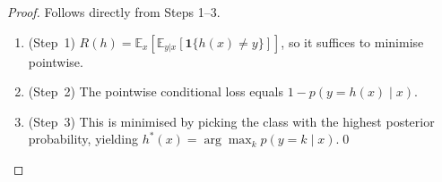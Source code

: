 \documentclass[11pt]{article}
\theoremstyle{definition}
\theoremstyle{remark}
\newcommand{\E}{\mathbb{E}}
\begin{document}
\begin{proof}
    Follows directly from Steps 1--3.
    \begin{enumerate}
        \item (Step~1) $R(h) = \E_{x}[\E_{y|x}[\mathbf{1}\{h(x)\neq y\}]]$,
              so it suffices to minimise pointwise.
        \item (Step~2) The pointwise conditional loss equals $1 - p(y = h(x)\mid x)$.
        \item (Step~3) This is minimised by picking the class with the highest
              posterior probability, yielding $h^{*}(x) = \arg\max_k p(y=k\mid x)$.\qed
    \end{enumerate}
\end{proof}

\end{document}
